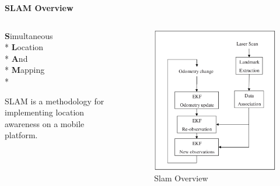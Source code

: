 \documentclass[xcolor=dvipsnames]{beamer}
\begin{document}
  \begin{frame}{\bf SLAM Overview}
    \begin{columns}[t]
      \begin{column}{0.5\textwidth}

        {\bf S}imultaneous \\*
        {\bf L}ocation \\*
        {\bf A}nd \\*
        {\bf M}apping \\*

        \vspace{1cm}

        SLAM is a methodology for implementing location awareness on a mobile platform.
      \end{column}
      \begin{column}{0.5\textwidth}
        \begin{figure}
          \begin{center}
            \includegraphics[scale=.3]{slamoverview.png}
          \end{center}
          \caption{Slam Overview \cite{SlamForDummies}}
          \label{fig:slamoverview}
        \end{figure}
      \end{column}
    \end{columns}
  \end{frame}
  
\end{document}
